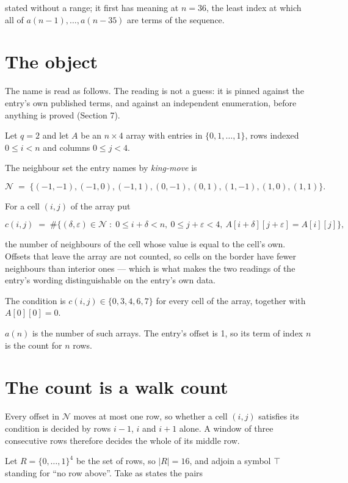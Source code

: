 \documentclass[11pt]{article}
\theoremstyle{definition}
\begin{document}
stated without a range; it first has meaning at $n = 36$, the least index at which all of $a(n-1),\dots,a(n-35)$ are terms of the sequence.

\section{The object}

The name is read as follows. The reading is not a guess: it is pinned against the entry's own published terms, and against an independent enumeration, before anything is proved (Section 7).

Let $q = 2$ and let $A$ be an $n \times 4$ array with entries in $\{0,1,\dots,1\}$, rows indexed $0 \le i < n$ and columns $0 \le j < 4$.

The neighbour set the entry names by {\itshape king-move} is

\[\mathcal{N} \;=\; \{(-1,-1), (-1,0), (-1,1), (0,-1), (0,1), (1,-1), (1,0), (1,1)\}.\]

For a cell $(i,j)$ of the array put

\[c(i,j) \;=\; \#\bigl\{(\delta,\varepsilon)\in\mathcal{N} \;:\; 0\le i+\delta<n,\ 0\le j+\varepsilon<4,\ A[i+\delta][j+\varepsilon] = A[i][j]\bigr\},\]

the number of neighbours of the cell whose value is equal to the cell's own. Offsets that leave the array are not counted, so cells on the border have fewer neighbours than interior ones --- which is what makes the two readings of the entry's wording distinguishable on the entry's own data.

The condition is $c(i,j) \in \{0, 3, 4, 6, 7\}$ for every cell of the array, together with $A[0][0]=0$.

$a(n)$ is the number of such arrays. The entry's offset is 1, so its term of index $n$ is the count for $n$ rows.

\section{The count is a walk count}

Every offset in $\mathcal{N}$ moves at most one row, so whether a cell $(i,j)$ satisfies its condition is decided by rows $i-1$, $i$ and $i+1$ alone. A window of three consecutive rows therefore decides the whole of its middle row.

Let $R = \{0,\dots,1\}^{4}$ be the set of rows, so $|R| = 16$, and adjoin a symbol $\top$ standing for ``no row above''. Take as states the pairs
\end{document}
